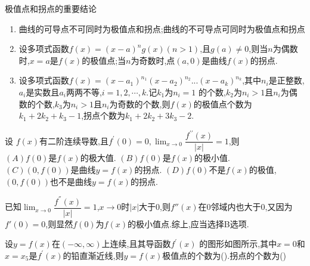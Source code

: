 \documentclass[8pt a4paper, oneside, UTF8]{ctexbook}  %
\begin{document}
\begin{sloppypar}
\begin{conclusion}{极值点和拐点的重要结论}{}
\begin{enumerate}
\begin{itemize}
                  \end{itemize}
            \item 曲线的可导点不可同时为极值点和拐点;曲线的不可导点可同时为极值点和拐点
            \item 设多项式函数$f(x)=(x-a)^n g(x)(n>1)$,且$g(a)\neq0$,则当$n$为偶数时,$x=a$是$f(x)$的极值点;当$n$为奇数时,点$(a,0)$是曲线$f(x)$的拐点.
            \item 设多项式函数$f(x)=(x-a_1)^{n_1}(x-a_2)^{n_2}...(x-a_k)^{n_k}$,其中$n_i$是正整数,$a_i$是实数且$a_i$两两不等,$i= 1, 2, \cdots,k$.记$k_1$为$n_i=1$ 的个数,$k_2$为$n_i>1$且$n_i$为偶数的个数,$k_3$为$n_i>1$且$n_i$为奇数的个数,则$f(x)$的极值点个数为$k_1+2k_2+k_3-1$,拐点个数为$k_1+2k_2+3k_3-2.$
        \end{enumerate}
    \end{conclusion}
    \begin{problem}
    设 $f(x)$有二阶连续导数,且$f^{\prime}(0)=0,\operatorname*{lim}_{x\to0}\dfrac{f^{\prime\prime}(x)}{|x|}=1$,则\\
    $(A)f(0)$是$f(x)$的极大值.\quad
    $(B)f(0)$是$f(x)$的极小值.\\
    $(C)(0,f(0))$是曲线$y=f(x)$的拐点.\quad
    $(D)f(0)$不是$f(x)$的极值,$(0,f(0))$也不是曲线$y=f(x)$的拐点.
    \end{problem}
    \begin{solution}
        已知$\lim_{x\to 0}\dfrac{f^{''}(x)}{|x|}=1$,$x\to 0$时$|x|$大于0,则$f''(x)$在0邻域内也大于0,又因为$f'(0)=0$,则显然$f(0)$为$f(x)$的极小值点.综上,应当选择B选项.
    \end{solution}
    \begin{problem}
    设$y=f(x)$在$(-\infty,\infty)$上连续,且其导函数$f^{\prime}(x)$ 的图形如图所示,其中$x=0$和$x=x_5$是$f^\prime(x)$的铅直渐近线,则$y=f(x)$极值点的个数为().拐点的个数为()
    \begin{center}
\end{center}
\end{problem}
\end{sloppypar}
\end{document}
